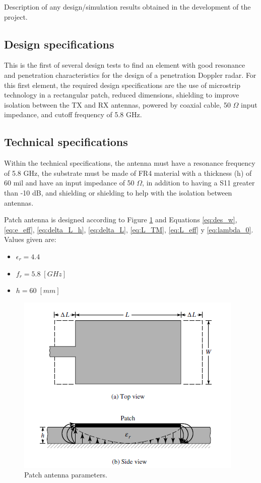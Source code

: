 \documentclass[lettersize,journal]{IEEEtran}
\begin{document}
Description of any design/simulation results obtained in the development of the project.

\subsection{Design specifications}

This is the first of several design tests to find an element with good resonance and penetration characteristics for the design of a penetration Doppler radar. For this first element, the required design specifications are the use of microstrip technology in a rectangular patch, reduced dimensions, shielding to improve isolation between the TX and RX antennas, powered by coaxial cable, 50 $\Omega$ input impedance, and cutoff frequency of 5.8 GHz.

\subsection{Technical specifications} 

Within the technical specifications, the antenna must have a resonance frequency of 5.8 GHz, the substrate must be made of FR4 material with a thickness (h) of 60 mil and have an input impedance of 50 $\Omega$, in addition to having a S11 greater than -10 dB, and shielding or shielding to help with the isolation between antennas.

Patch antenna is designed according to Figure \ref{fig:AntThe} and Equations \eqref{eq:des_w}, \eqref{eq:e_eff}, \eqref{eq:delta_L_h}, \eqref{eq:delta_L}, \eqref{eq:L_TM}, \eqref{eq:L_eff} y \eqref{eq:lambda_0}. Values given are:

\begin{itemize}
\item  $\epsilon_r=4.4$
\item $f_r=5.8 \; [GHz]$
\item $h=60 \; [mm]$

\end{itemize}

\begin{figure}[H]
\centering
\includegraphics[width=0.7\linewidth]{figs/AntThe.png}
\caption{Patch antenna parameters. \cite{balanisAntennaTheoryAnalysis2005}}
\label{fig:AntThe}
\end{figure}
\end{document}
